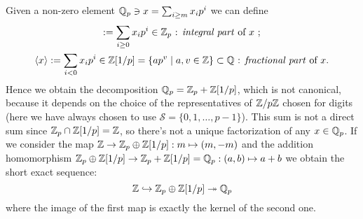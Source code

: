 		Given a non-zero element $\mathbb{Q}_p \ni x = \sum_{i \geq m}x_ip^i$ we can define
		\begin{gather*}
			[x] := \sum_{i \geq 0}x_ip^i \in \Zp \text{ : \emph{integral part} of $x$ }; \\
			\langle x \rangle := \sum_{i < 0} x_ip^i \in \Z[1/p] = \{ap^v \mid a,v \in \Z \} \subset \Q \text{ : \emph{fractional part} of $x$}.
		\end{gather*}
		Hence we obtain the decomposition $\mathbb{Q}_p = \mathbb{Z}_p + \mathbb{Z}[1/p]$, which is not canonical, because it depends on the choice of the representatives of $\mathbb{Z}/p\mathbb{Z}$ chosen for digits (here we have always chosen to use $\mathcal{S} = \{0, 1, \dots, p-1\}$). This sum is not a direct sum since $\mathbb{Z}_p \cap \mathbb{Z}[1/p] = \mathbb{Z}$, so there's not a unique factorization of any $x \in \mathbb{Q}_p$. If we consider the map $\mathbb{Z} \to \mathbb{Z}_p \oplus \mathbb{Z}[1/p]: m \mapsto (m, -m)$ and the addition homomorphism $\mathbb{Z}_p \oplus \mathbb{Z}[1/p] \to \mathbb{Z}_p + \mathbb{Z}[1/p] = \mathbb{Q}_p: (a, b) \mapsto a+b$ we obtain the short exact sequence:
		\begin{equation*}
			\mathbb{Z} \hookrightarrow \mathbb{Z}_p \oplus \mathbb{Z}[1/p] \twoheadrightarrow \mathbb{Q}_p
		\end{equation*}
		where the image of the first map is exactly the kernel of the second one.
